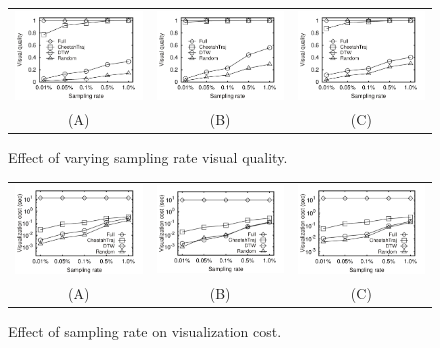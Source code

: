 \begin{figure}
	\centering
	\small
	\begin{tabular}{ccc}
		\includegraphics[width=0.28\linewidth]{pictures/quantitative_study/rate_porto_q}
		&
		\includegraphics[width=0.28\linewidth]{pictures/quantitative_study/rate_sz_q}
        &
		\includegraphics[width=0.28\linewidth]{pictures/quantitative_study/rate_cd_q}
		\\
		(A) \pt{}
		&
		(B) \sz{}
		&
		(C) \cd{}
	\end{tabular}
    \trim
	\caption{Effect of varying sampling rate visual quality.}
	\label{fig:rate_quality}
	\trim \trim
\end{figure}

\begin{figure}
	\centering
	\small
	\begin{tabular}{ccc}
		\includegraphics[width=0.28\linewidth]{pictures/quantitative_study/rate_porto_t}
		&
		\includegraphics[width=0.28\linewidth]{pictures/quantitative_study/rate_sz_t}
        &
		\includegraphics[width=0.28\linewidth]{pictures/quantitative_study/rate_cd_t}
		\\
		(A) \pt{}
		&
		(B) \sz{}
		&
		(C) \cd{}
	\end{tabular}
    \trim
	\caption{Effect of  sampling rate on visualization cost.}
	\label{fig:rate_vistime}
	\trim \trim
\end{figure}

